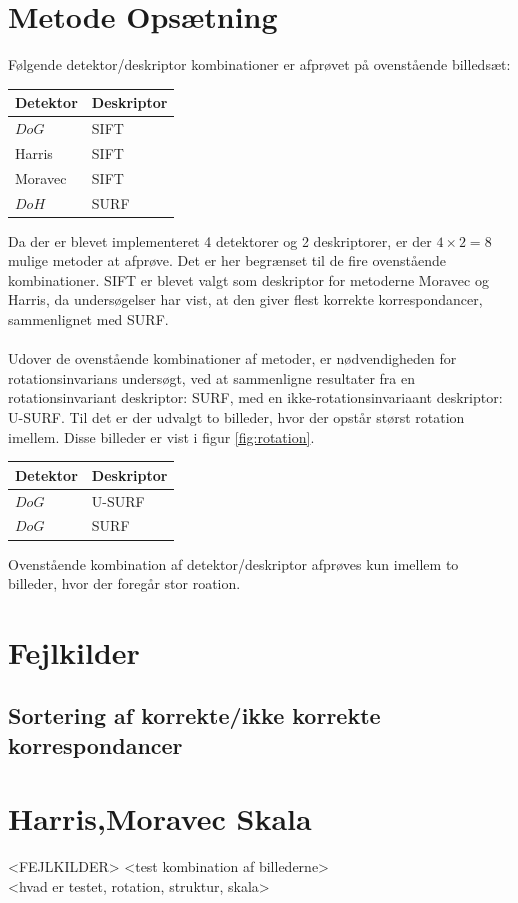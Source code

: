 \section{Metode Opsætning}
Følgende detektor/deskriptor kombinationer er afprøvet på ovenstående billedsæt:
\begin{center}
    \begin{tabular}{ | l | l |}
    \hline
    Detektor & Deskriptor \\ \hline
    $DoG$ & SIFT  \\ \hline       
    Harris & SIFT \\ \hline    
    Moravec & SIFT \\ \hline    
    $DoH$ & SURF\\ \hline    
    \end{tabular}
\end{center}
Da der er blevet implementeret 4 detektorer og 2 deskriptorer, er der $4\times 2=8$ mulige metoder at afprøve. Det er her begrænset til de fire ovenstående kombinationer. SIFT er blevet valgt som deskriptor for metoderne Moravec og Harris, da undersøgelser har vist, at den giver flest korrekte korrespondancer, sammenlignet med SURF. 
\\ \\ 
Udover de ovenstående kombinationer af metoder, er nødvendigheden for rotationsinvarians undersøgt, ved at sammenligne resultater fra en rotationsinvariant deskriptor: SURF, med en ikke-rotationsinvariaant deskriptor: U-SURF. Til det er der udvalgt to billeder, hvor der opstår størst rotation imellem. Disse billeder er vist i figur \ref{fig:rotation}.
\begin{center}
    \begin{tabular}{ | l | l |}
    \hline
    Detektor & Deskriptor \\ \hline
    $DoG$ & U-SURF \\ \hline       
    $DoG$ & SURF \\ \hline     
    \end{tabular}
\end{center}
Ovenstående kombination af detektor/deskriptor afprøves kun imellem to billeder, hvor der foregår stor roation.
\section{Fejlkilder}
\subsection{Sortering af korrekte/ikke korrekte korrespondancer}
\section{Harris,Moravec Skala}
<FEJLKILDER>
<test kombination af billederne> \\
<hvad er testet, rotation, struktur, skala>